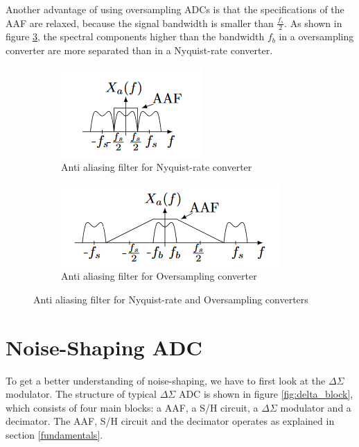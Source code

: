 Another advantage of using oversampling ADCs is that the specifications of the AAF are relaxed, because the signal bandwidth is smaller than $\frac{f_s}{2}$. As shown in figure \ref{fig:AAF}, the spectral components higher than the bandwidth $f_b$ in a oversampling converter are more separated than in a Nyquist-rate converter. 

\begin{figure}
\centering
\begin{subfigure}[b]{0.35\textwidth}
   \includegraphics[width=1\linewidth]{images/nyquist_aaf.png}
   \caption{Anti aliasing filter for Nyquist-rate converter}
   \label{fig:AAf_NQ} 
\end{subfigure}

\begin{subfigure}[b]{0.55\textwidth}
   \includegraphics[width=1\linewidth]{images/over_aaf.png}
   \caption{Anti aliasing filter for Oversampling converter}
   \label{fig:AAF_OV}
\end{subfigure}

\caption{Anti aliasing filter for Nyquist-rate and Oversampling converters}
\label{fig:AAF}
\end{figure}

\section{Noise-Shaping ADC}
To get a better understanding of noise-shaping, we have to first look at the $\Delta\Sigma$ modulator. The structure of typical $\Delta\Sigma$ ADC is shown in figure \ref{fig:delta_block}, which consists of four main blocks: a AAF, a S/H circuit, a $\Delta\Sigma$ modulator and a decimator. The AAF, S/H circuit and the decimator operates as explained in section \ref{fundamentals}.

